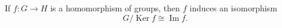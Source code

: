 \begin{theorem}
If $f : G \rightarrow H$ is a homomorphism of groups, then $f$ induces an isomorphism
\[
G/\operatorname{Ker} f \cong \operatorname{Im} f.
\]
\end{theorem}
